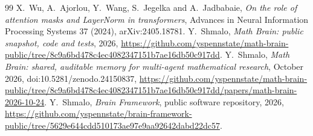 \documentclass[11pt]{amsart}
\theoremstyle{definition}
\theoremstyle{remark}
\numberwithin{equation}{section}
\begin{document}
\begin{thebibliography}{99}
 X.~Wu, A.~Ajorlou, Y.~Wang, S.~Jegelka and A.~Jadbabaie, \emph{On the role of attention masks and LayerNorm in transformers}, Advances in Neural Information Processing Systems 37 (2024), arXiv:2405.18781.
 Y.~Shmalo, \emph{Math Brain: public snapshot, code and tests}, 2026, \url{https://github.com/yspennstate/math-brain-public/tree/8c9a6bd478c4ec4082347151b7ae16db50c917dd}.
 Y.~Shmalo, \emph{Math Brain: shared, auditable memory for multi-agent mathematical research}, October 2026, doi:10.5281/zenodo.24150837, \url{https://github.com/yspennstate/math-brain-public/tree/8c9a6bd478c4ec4082347151b7ae16db50c917dd/papers/math-brain-2026-10-24}.
 Y.~Shmalo, \emph{Brain Framework}, public software repository, 2026, \url{https://github.com/yspennstate/brain-framework-public/tree/5629e644cdd510173ae97e9aa92642dabd22dc57}.
\end{thebibliography}
\end{document}
